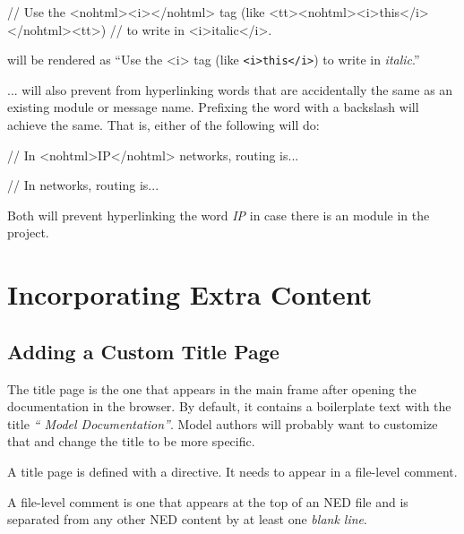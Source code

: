 \begin{ned}
// Use the <nohtml><i></nohtml> tag (like <tt><nohtml><i>this</i></nohtml><tt>)
// to write in <i>italic</i>.
\end{ned}

will be rendered as ``Use the <i> tag (like \texttt{<i>this</i>}) to write
in \textit{italic}.''

... will also prevent 
from hyperlinking words that are accidentally the same as an existing
module or message name. Prefixing the word with a backslash will achieve
the same. That is, either of the following will do:

\begin{ned}
// In <nohtml>IP</nohtml> networks, routing is...
\end{ned}

\begin{ned}
// In \IP networks, routing is...
\end{ned}

Both will prevent hyperlinking the word \textit{IP} in case there is an
 module in the project.



\section{Incorporating Extra Content}
\label{sec:neddoc:incorporating-extra-content}

\subsection{Adding a Custom Title Page}
\label{sec:neddoc:adding-custom-title-page}

The title page is the one that appears in the main frame after opening the
documentation in the browser. By default, it contains a boilerplate text
with the title \textit{``{\opp} Model Documentation''}. Model authors will
probably want to customize that and change the title to be more
specific.

A title page is defined with a  directive. It needs to
appear in a file-level comment.

\begin{note}
A file-level comment is one that appears at the top of an NED file and is
separated from any other NED content by at least one \textit{blank line}.
\end{note}

